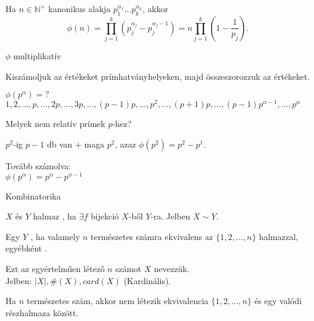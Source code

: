 \begin{frame}
  \begin{tcolorbox}[title={Tétel: ${\phi}$(n) kiszámolása}]
    Ha $n \in \mathbb{N}^+$ kanonikus alakja $p_1^{{\alpha}_1}...p_k^{{\alpha}_k}$, akkor\\
    $${\phi}(n) = \prod^k_{j=1} (p_j^{{\alpha}_j} - p_j^{{\alpha}_j - 1}) = n \prod^k_{j=1} (1 - \frac{1}{p_j}).$$
  \tcblower
    \mmedskip
    
    $\phi$ multiplikatív\\
    \msmallskip
    
    Kiszámoljuk az értékeket prímhatványhelyeken, majd összeszorozzuk az értékeket.\\
    \msmallskip
    
    ${\phi}(p^{\alpha}) = ?$\\
    $1, 2, ..., p, ..., 2p, ..., 3p, ..., (p-1)p, ..., p^2, ..., (p+1)p, ..., (p-1)p^{{\alpha}-1}, ..., p^{\alpha}$\\
    \msmallskip
    
    Melyek nem relatív prímek $p$-hez?\\
    \msmallskip
    
    $p^2$-ig $p - 1$ db van + maga $p^2$, azaz ${\phi}(p^2) = p^2 - p^1$.\\
    \msmallskip
    
    Tovább számolva:\\
    ${\phi}(p^{\alpha}) = p^{\alpha} - p^{\phi - 1}$
  \end{tcolorbox}
\end{frame}

\begin{frame}[plain]
  \begin{tcolorbox}[center, colback={myyellow}, coltext={black}, colframe={myyellow}]
      {\RHuge Kombinatorika}
      \mmedskip
  \end{tcolorbox}
\end{frame}


\begin{frame}
  \begin{tcolorbox}[title={Def.: Halmazok ekvivalenciája}]
    $X$ és $Y$ halmaz , ha ${\exists} f$ bijekció $X$-ből $Y$-ra. Jelben $X \sim Y$.\\
    \mmedskip

    Egy $Y$ , ha valamely $n$ természetes számra ekvivalens az $\{ 1, 2, ..., n \}$ halmazzal, egyébként .\\
    \mmedskip

    Ezt az egyértelműen létező $n$ számot $X$  nevezzük.\\
    Jelben: $|X|, \#(X), card(X)$ (Kardinális).
  \end{tcolorbox}

  \begin{tcolorbox}[title={Tétel: Véges halmaz valódi részhalmaza}]
    Ha $n$ természetes szám, akkor nem létezik ekvivalencia $\{ 1, 2, ..., n \}$ és egy valódi részhalmaza között.
  \end{tcolorbox}
\end{frame}

